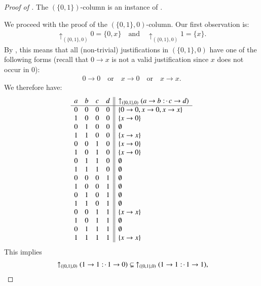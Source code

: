 \documentclass[11pt]{amsart}
\theoremstyle{definition} %
\newcommand{\righttherefore}{:\joinrel\cdot\,}
\begin{document}
\begin{proof}[Proof of ] The $(\{0,1\})$-column is an instance of .

We proceed with the proof of the $(\{0,1\},0)$-column. Our first observation is:
\begin{align*} 
	\uparrow_{(\{0,1\},0)} 0=\{0,x\} \quad\text{and}\quad \uparrow_{(\{0,1\},0)} 1=\{x\}.
\end{align*} By , this means that all (non-trivial) justifications in $(\{0,1\},0)$ have one of the following forms (recall that $0\to x$ is not a valid justification since $x$ does not occur in $0$):
\begin{align*} 
	0\to 0 \quad\text{or}\quad x\to 0 \quad\text{or}\quad x\to x.
\end{align*} We therefore have:
\begin{align*}
\begin{array}{cccc||l}
	a & b & c & d & \uparrow_{(\{0,1\},0)}(a\to b\righttherefore c\to d)\\
	\hline
	0 & 0 & 0 & 0 & \{0\to 0,x\to 0,x\to x\}\\
	1 & 0 & 0 & 0 & \{x\to 0\}\\
	0 & 1 & 0 & 0 & \emptyset\\ %
	1 & 1 & 0 & 0 & \{x\to x\}\\
	0 & 0 & 1 & 0 & \{x\to 0\}\\
	1 & 0 & 1 & 0 & \{x\to 0\}\\
	0 & 1 & 1 & 0 & \emptyset\\
	1 & 1 & 1 & 0 & \emptyset\\
	0 & 0 & 0 & 1 & \emptyset\\ %
	1 & 0 & 0 & 1 & \emptyset\\
	0 & 1 & 0 & 1 & \emptyset\\ %
	1 & 1 & 0 & 1 & \emptyset\\
	0 & 0 & 1 & 1 & \{x\to x\}\\
	1 & 0 & 1 & 1 & \emptyset\\
	0 & 1 & 1 & 1 & \emptyset\\
	1 & 1 & 1 & 1 & \{x\to x\}
\end{array}
\end{align*} This implies
\begin{align*}
	&\uparrow_{(\{0,1\},0)}(1\to 1\righttherefore 1\to 0)\subsetneq\ \uparrow_{(\{0,1\},0)}(1\to 1\righttherefore 1\to 1),\\

\end{align*}
\end{proof}
\end{document}
